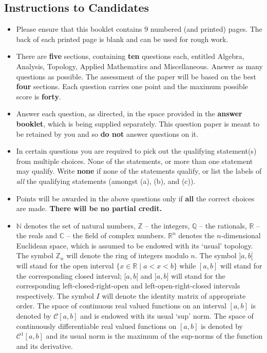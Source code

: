 \documentclass[11pt,a4paper]{article}
\newcommand{\N}{\mathbb{N}}
\newcommand{\Z}{\mathbb{Z}}
\newcommand{\Q}{\mathbb{Q}}
\newcommand{\R}{\mathbb{R}}
\newcommand{\C}{\mathbb{C}}
\begin{document}
\subsection*{Instructions to Candidates}
\begin{itemize}
  \item Please ensure that this booklet contains 9 numbered (and printed) pages. The back of each printed page is blank and can be used for rough work.
  \item There are \textbf{five} sections, containing \textbf{ten} questions each, entitled Algebra, Analysis, Topology, Applied Mathematics and Miscellaneous. Answer as many questions as possible. The assessment of the paper will be based on the best \textbf{four} sections. Each question carries one point and the maximum possible score is \textbf{forty}.
  \item Answer each question, as directed, in the space provided in the \textbf{answer booklet}, which is being supplied separately. This question paper is meant to be retained by you and so \textbf{do not} answer questions on it.
  \item In certain questions you are required to pick out the qualifying statement(s) from multiple choices. None of the statements, or more than one statement may qualify. Write \textbf{none} if none of the statements qualify, or list the labels of \emph{all} the qualifying statements (amongst (a), (b), and (c)).
  \item Points will be awarded in the above questions only if \textbf{all} the correct choices are made. \textbf{There will be no partial credit.}
  \item $\N$ denotes the set of natural numbers, $\Z$ -- the integers, $\Q$ -- the rationals, $\R$ -- the reals and $\C$ -- the field of complex numbers. $\R^n$ denotes the $n$-dimensional Euclidean space, which is assumed to be endowed with its `usual' topology. The symbol $\Z_n$ will denote the ring of integers modulo $n$. The symbol $]a, b[$ will stand for the open interval $\{x \in \R \mid a < x < b\}$ while $[a, b]$ will stand for the corresponding closed interval; $[a, b[$ and $]a, b]$ will stand for the corresponding left-closed-right-open and left-open-right-closed intervals respectively. The symbol $I$ will denote the identity matrix of appropriate order. The space of continuous real valued functions on an interval $[a, b]$ is denoted by $\mathcal{C}[a, b]$ and is endowed with its usual `sup' norm. The space of continuously differentiable real valued functions on $[a, b]$ is denoted by $\mathcal{C}^1[a, b]$ and its usual norm is the maximum of the sup-norms of the function and its derivative.
\end{itemize}
\end{document}
